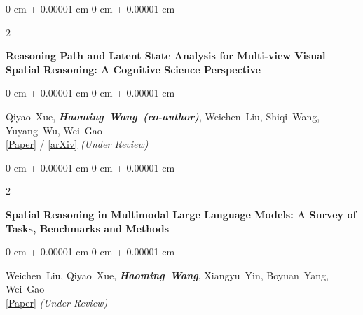 \documentclass[10pt, letterpaper]{article}
\newenvironment{onecolentry}{
    \begin{adjustwidth}{
        0 cm + 0.00001 cm
    }{
        0 cm + 0.00001 cm
    }
}{
    \end{adjustwidth}
} %
\newenvironment{twocolentry}[2][]{
    \onecolentry
    \def\secondColumn{#2}
    \setcolumnwidth{\fill, 4.5 cm}
    \begin{paracol}{2}
}{
    \switchcolumn \raggedleft \secondColumn
    \end{paracol}
    \endonecolentry
} %
\let\hrefWithoutArrow\href
\begin{document}
\begin{samepage}
            \vspace{0.3 cm}

            \begin{twocolentry}{
                2026
            }
                \textbf{Reasoning Path and Latent State Analysis for Multi-view Visual Spatial Reasoning: A Cognitive Science Perspective}
            \end{twocolentry}
            \vspace{0.10 cm}
            \begin{onecolentry}
                \mbox{Qiyao Xue}, \mbox{\textbf{\textit{Haoming Wang (co-author)}}}, \mbox{Weichen Liu}, \mbox{Shiqi Wang}, \mbox{Yuyang Wu}, \mbox{Wei Gao}
                \vspace{0.10 cm}
                \\ \hrefWithoutArrow{#}{[Paper]} / \hrefWithoutArrow{#}{[arXiv]} \textit{(Under Review)}
            \end{onecolentry}
            
            \vspace{0.3 cm}

            \begin{twocolentry}{
                2026
            }
                \textbf{Spatial Reasoning in Multimodal Large Language Models: A Survey of Tasks, Benchmarks and Methods}
            \end{twocolentry}
            \vspace{0.10 cm}
            \begin{onecolentry}
                \mbox{Weichen Liu}, \mbox{Qiyao Xue}, \mbox{\textbf{\textit{Haoming Wang}}}, \mbox{Xiangyu Yin}, \mbox{Boyuan Yang}, \mbox{Wei Gao}
                \vspace{0.10 cm}
                \\ \hrefWithoutArrow{#}{[Paper]} \textit{(Under Review)}
            \end{onecolentry}
        
        \end{samepage}
        
\end{document}

